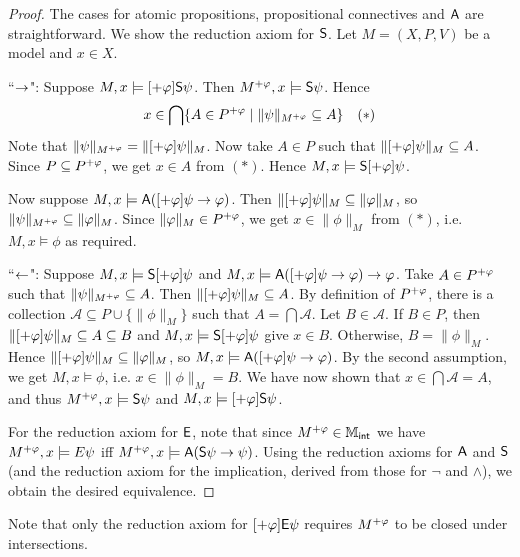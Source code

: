 \begin{proof}
The cases for atomic propositions, propositional connectives and
$\A$ are straightforward. We show the reduction axiom for
$\S$. Let $M = (X, P, V)$ be a model and $x \in X$.

``$\limplies$": Suppose $M, x \models [\expinc\phi]\S\psi$.
Then $M^{\expinc\phi}, x \models \S\psi$. Hence
\[
x \in
\bigcap\{
   A \in P^{\expinc\phi}
   \mid
   \|\psi\|_{M^{\expinc\phi}} \subseteq A
\}
\quad (*)\]
Note that $\|\psi\|_{M^{\expinc\phi}} = \|[\expinc\phi]\psi\|_M$.
Now take $A \in P$ such that $\|[\expinc\phi]\psi\|_M
\subseteq A$. Since $P \subseteq P^{\expinc\phi}$, we get $x
\in A$ from $(*)$. Hence $M, x \models \S[\expinc\phi]\psi$.

Now suppose $M, x \models \A([\expinc\phi]\psi \limplies \phi)$.
Then $\|[\expinc\phi]\psi\|_M \subseteq \|\phi\|_M$, so
$\|\psi\|_{M^{\expinc\phi}} \subseteq \|\phi\|_M$. Since
$\|\phi\|_M \in P^{\expinc\phi}$, we get $x \in \|\phi\|_M$
from $(*)$, i.e. $M, x \models \phi$ as required.

``$\limpliedby$": Suppose $M, x \models \S[\expinc\phi]\psi$
and $M, x \models \A([\expinc\phi]\psi \limplies \phi) \limplies
\phi$. Take $A \in P^{\expinc\phi}$ such that
$\|\psi\|_{M^{\expinc\phi}} \subseteq A$. Then
$\|[\expinc\phi]\psi\|_M \subseteq A$. By definition of
$P^{\expinc\phi}$, there is a collection $\mathcal{A}
\subseteq P \cup \{\|\phi\|_M\}$ such that $A =
\bigcap\mathcal{A}$. Let $B \in \mathcal{A}$. If $B \in P$,
then $\|[\expinc\phi]\psi\|_M \subseteq A \subseteq B$ and
$M, x \models \S[\expinc\phi]\psi$ give $x \in B$. Otherwise,
$B = \|\phi\|_M$. Hence $\|[\expinc\phi]\psi\|_M \subseteq
\|\phi\|_M$, so $M, x \models \A([\expinc\phi]\psi \limplies
\phi)$. By the second assumption, we get $M, x \models \phi$, i.e.
$x \in \|\phi\|_M = B$. We have now shown that $x \in
\bigcap\mathcal{A} = A$, and thus $M^{\expinc\phi}, x \models
\S\psi$ and $M, x \models [\expinc\phi]\S\psi$.

For the reduction axiom for $\E$, note that since
$M^{\expinc\phi} \in \Mint$ we have $M^{\expinc\phi}, x
\models E\psi$ iff $M^{\expinc\phi}, x \models \A(\S\psi \limplies
\psi)$. Using the reduction axioms for $\A$ and $\S$ (and the
reduction axiom for the implication, derived from those for $\neg$
and $\land$), we obtain the desired equivalence.
\end{proof}

Note that only the reduction axiom for $[\expinc\phi]\E\psi$ requires
$M^{\expinc\phi}$ to be closed under intersections.

